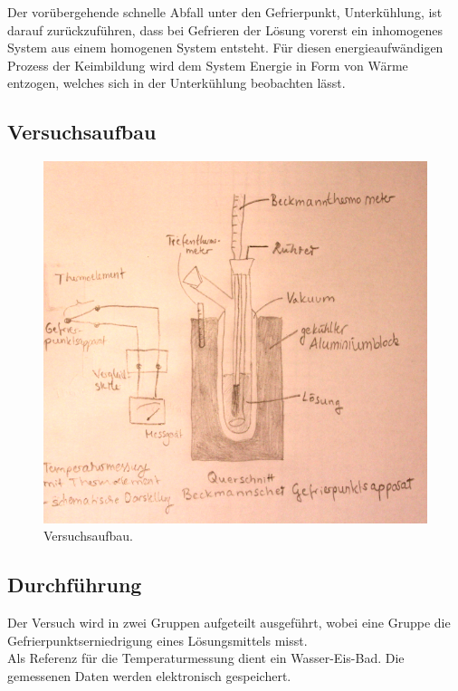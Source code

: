 \documentclass[12pt,a4paper,titlepage,headinclude,bibtotoc]{scrartcl}
\begin{document}
Der vorübergehende schnelle Abfall unter den Gefrierpunkt, Unterkühlung, ist darauf zurückzuführen, dass bei Gefrieren der Lösung vorerst ein inhomogenes System aus einem homogenen System entsteht. Für diesen energieaufwändigen Prozess der Keimbildung wird dem System Energie in Form von Wärme entzogen, welches sich in der Unterkühlung beobachten lässt.


\subsection{Versuchsaufbau}



\begin{figure} [h!]
\begin{center}
\includegraphics[scale=0.8]{Versuchsaufbau2neu.png} \end{center}
\caption{Versuchsaufbau.}
\end{figure}

\subsection{Durchführung}

Der Versuch wird in zwei Gruppen aufgeteilt ausgeführt, wobei eine Gruppe die Gefrierpunktserniedrigung eines Lösungsmittels misst. \\
Als Referenz für die Temperaturmessung dient ein Wasser-Eis-Bad. Die gemessenen Daten werden elektronisch gespeichert.\\
 
\end{document}
